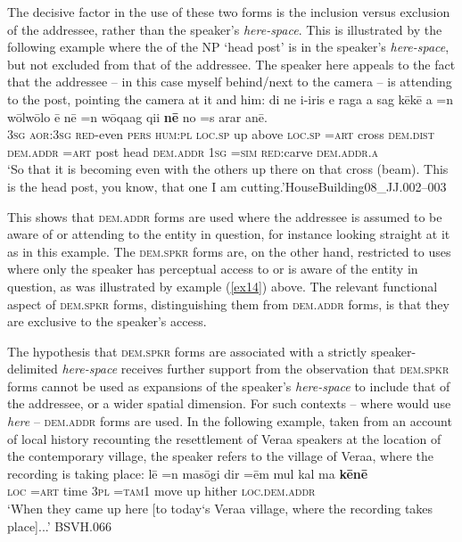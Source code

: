 \documentclass[output=paper
,modfonts
,nonflat]{langsci/langscibook}
\begin{document}
The decisive factor in the use of these two forms is the inclusion versus exclusion of the addressee, rather than the speaker's \textit{here-space}. This is illustrated by the following example where the  of the NP `head post' is in the speaker's \textit{here-space}, but not excluded from that of the addressee. The speaker here appeals to the fact that the addressee -- in this case myself behind/next to the camera -- is attending to the post, pointing the camera at it and him:
\ea	\label{ex23}
\gll		di 		ne 		{\textquotesingle}i-{\textquotesingle}iris 	e 		raga 		a 		sag 	k\=ek\=e 		a		=n 	w\=olw\=olo \=e	n\=e		=n 	w\=oqa{\textquotesingle}ag	qi{\textquotesingle}i 	\textbf{n\=e} 	no		=s 		{\textquotesingle}ar{\textquotesingle}ar 	an\=e.	\\
		\textsc{3sg}	\textsc{aor:3sg}	\textsc{red-}even	\textsc{pers}	\textsc{hum:pl}	\textsc{loc.sp}		up		above		\textsc{loc.sp}	\textsc{=art}	cross		\textsc{dem.dist}	\textsc{dem.addr}	\textsc{=art}	post			head		\textsc{dem.addr}	\textsc{1sg}		\textsc{=sim}		\textsc{red}:carve	\textsc{dem.addr.a}	\\
\glt	`So that it is becoming even with the others up there on that cross (beam). This is the head post, you know, that one I am cutting.'\hfill{HouseBuilding08\_JJ.002--003}
\z

\noindent
This shows that \textsc{dem.addr} forms are used where the addressee is assumed to be aware of or attending to the entity in question, for instance looking straight at it as in this example. The \textsc{dem.spkr} forms are, on the other hand, restricted to uses where only the speaker has perceptual access to or is aware of the entity in question, as was illustrated by example (\ref{ex14}) above. The relevant functional aspect of \textsc{dem.spkr} forms, distinguishing them from \textsc{dem.addr} forms, is that they are exclusive to the speaker's access.

The hypothesis that \textsc{dem.spkr} forms are associated with a strictly speaker-delimited \textit{here-space} receives further support from the observation that \textsc{dem.spkr} forms cannot be used as expansions of the speaker's \textit{here-space} to include that of the addressee, or a wider spatial dimension. For such contexts -- where  would use \textit{here} -- \textsc{dem.addr} forms are used. In the following example, taken from an account of local history recounting the resettlement of Vera{\textquotesingle}a speakers at the location of the contemporary village, the speaker refers to the village of Vera{\textquotesingle}a, where the recording is taking place:
\ea	\label{ex24}
\gll	l\=e		=n 	mas\=ogi 	dir	=\=em 	mul 	kal 	ma 	\textbf{k\=en\=e}			\\
	\textsc{loc}	\textsc{=art}	time	\textsc{3pl}	\textsc{=tam1}	move	up		hither		\textsc{loc.dem.addr}		\\
\glt	`When they came up here [to today`s Vera{\textquotesingle}a village, where the recording takes place]...'		\hfill{BSVH.066}
\z
\end{document}
